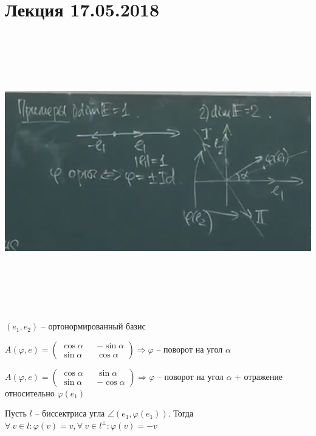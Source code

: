 \section{Лекция 17.05.2018}

\includegraphics[width=15cm,height=12cm,keepaspectratio]{examples1.jpg}

\vspace{\baselineskip}
$(e_1, e_2)$ -- ортонормированный базис

\vspace{\baselineskip}
 $A(\varphi, e) = \begin{pmatrix} \cos \alpha && -\sin \alpha \\ \sin \alpha && \cos \alpha
\end{pmatrix} \Rightarrow \varphi$ -- поворот на угол $\alpha$

\vspace{\baselineskip}
 $A(\varphi, e) = \begin{pmatrix} \cos \alpha && \sin \alpha \\ \sin \alpha && -\cos \alpha \end{pmatrix} \Rightarrow \varphi$ -- поворот на угол $\alpha$ + отражение относительно $\varphi(e_1)$

Пусть $l$ -- биссектриса угла $\angle (e_1, \varphi(e_1))$. Тогда $\forall \ v \in l: \varphi(v) = v, \forall \ v \in l^{\bot}: \varphi(v) = -v$

